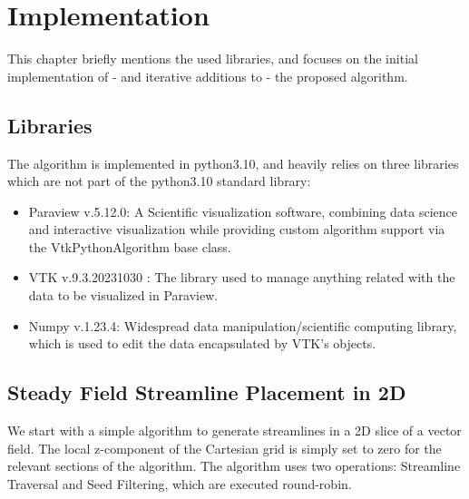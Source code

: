\chapter{Implementation}
This chapter briefly mentions the used libraries, and focuses on the initial implementation of - and iterative additions to - the proposed algorithm.
\section{Libraries}
The algorithm is implemented in python3.10, and heavily relies on three libraries which are not part of the python3.10 standard library:
\begin{itemize}
    \item Paraview v.5.12.0: A Scientific visualization software, combining data science and interactive visualization while providing custom algorithm support via the VtkPythonAlgorithm base class.
    \item VTK v.9.3.20231030 : The library used to manage anything related with the data to be visualized in Paraview.
    \item Numpy v.1.23.4: Widespread data manipulation/scientific computing library, which is used to edit the data encapsulated by VTK's objects.
\end{itemize}

\section{Steady Field Streamline Placement in 2D}
We start with a simple algorithm to generate streamlines in a 2D slice of a vector field.
The local z-component of the Cartesian grid is simply set to zero for the relevant sections of the algorithm.
The algorithm uses two operations: Streamline Traversal and Seed Filtering, which are executed round-robin.
